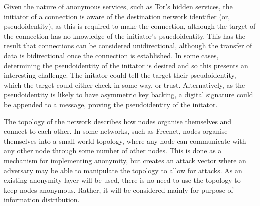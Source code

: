 			Given the nature of anonymous services, such as Tor's hidden services, the initiator of a connection is aware of the destination network identifier (or, pseudoidentity), as this is required to make the connection, although the target of the connection has no knowledge of the initiator's psuedoidentity. This has the result that connections can be considered unidirectional, although the transfer of data is bidirectional once the connection is established. In some cases, determining the pseudoidentity of the initator is desired and so this presents an interesting challenge. The initator could tell the target their pseudoidentity, which the target could either check in some way, or trust. Alternatively, as the pseudoidentity is likely to have asymmetric key backing, a digital signature could be appended to a message, proving the pseudoidentity of the initator.
			
			
			
			The topology of the network describes how nodes organise themselves and connect to each other. In some networks, such as Freenet, nodes organise themselves into a small-world topology, where any node can communicate with any other node through some number of other nodes. This is done as a mechanism for implementing anonymity, but creates an attack vector where an adversary may be able to manipulate the topology to allow for attacks. As an existing anonymity layer will be used, there is no need to use the topology to keep nodes anonymous. Rather, it will be considered mainly for purpose of information distribution.
			

